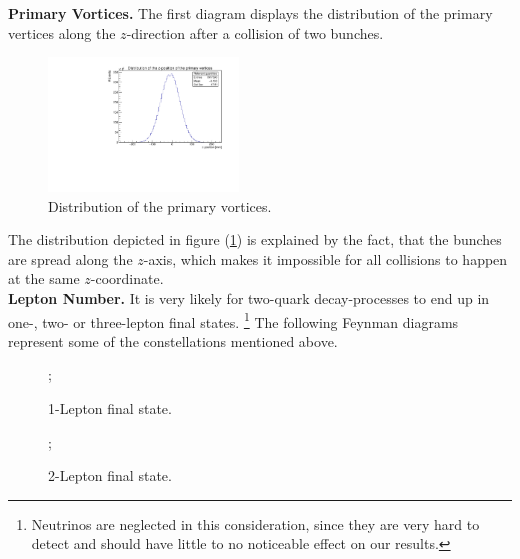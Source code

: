 \documentclass[twocolumn,
			   showpacs,%
               nofootinbib,
               aps,%
               prd,
               notitlepage,
               showkeys,
               10pt]{revtex4-1}
\begin{document}
\textbf{Primary Vortices.} The first diagram displays the distribution of the primary vertices along the $z$-direction after a collision of two bunches.
\begin{figure}[H]
\centering
\includegraphics[width = 0.45\textwidth]{figures/plots/DistPrimVort}
\caption{Distribution of the primary vortices.}
\label{fig:vortices}
\end{figure}
The distribution depicted in figure (\ref{fig:vortices}) is explained by the fact, that the bunches are spread along the $z$-axis, which makes it impossible for all collisions to happen at the same $z$-coordinate.\\

\textbf{Lepton Number.} It is very likely for two-quark decay-processes to end up in one-, two- or three-lepton final states. \footnote{Neutrinos are neglected in this consideration, since they are very hard to detect and should have little to no noticeable effect on our results.} The following Feynman diagrams represent some of the constellations mentioned above. 

\begin{figure}[H]
\centering	
{};
\caption{1-Lepton final state.}
\end{figure}

\begin{figure}[H]
\centering	
{};
\caption{2-Lepton final state.}
\end{figure}
\end{document}
